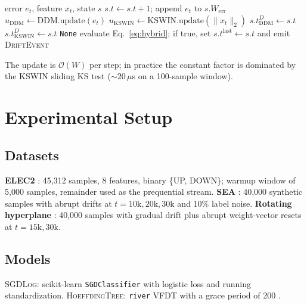 \documentclass[conference]{IEEEtran}
\begin{document}
\begin{algorithm}[H]
\caption{HybridDD update step}
\begin{algorithmic}[1]
\REQUIRE error $e_t$, feature $x_t$, state $s$
\STATE $s.t \gets s.t + 1$; append $e_t$ to $s.W_{\text{err}}$
\STATE $u_{\mathrm{DDM}} \gets \mathrm{DDM.update}(e_t)$
\STATE $u_{\mathrm{KSWIN}} \gets \mathrm{KSWIN.update}(\|x_t\|_2)$
 \STATE $s.t^{D}_{\mathrm{DDM}} \gets s.t$ \ENDIF
{} \STATE $s.t^{D}_{\mathrm{KSWIN}} \gets s.t$ \ENDIF
{} \RETURN \texttt{None} \ENDIF
\STATE evaluate Eq.~\eqref{eq:hybrid}; if true, set $s.t^{\mathrm{last}} \gets s.t$ and emit \textsc{DriftEvent}
\end{algorithmic}
\end{algorithm}

The update is $\mathcal{O}(W)$ per step; in practice the constant factor is
dominated by the KSWIN sliding KS test ($\sim 20\,\mu$s on a 100-sample window).

\section{Experimental Setup}
\label{sec:setup}

\subsection{Datasets}

\textbf{ELEC2} \cite{harries1999elec}: 45,312 samples, 8 features, binary
\{UP, DOWN\}; warmup window of 5{,}000 samples, remainder used as the
prequential stream. \textbf{SEA} \cite{street2001sea}: 40{,}000 synthetic
samples with abrupt drifts at $t=10\text{k}, 20\text{k}, 30\text{k}$ and 10\%
label noise. \textbf{Rotating hyperplane}
\cite{hulten2001hyperplane}: 40{,}000 samples with gradual drift plus abrupt
weight-vector resets at $t=15\text{k}, 30\text{k}$.

\subsection{Models}

\textsc{SGDLog}: scikit-learn \verb|SGDClassifier| with logistic loss and
running standardization. \textsc{HoeffdingTree}: \texttt{river} VFDT with a
grace period of 200 \cite{domingos2000hoeffding}.
\end{document}
